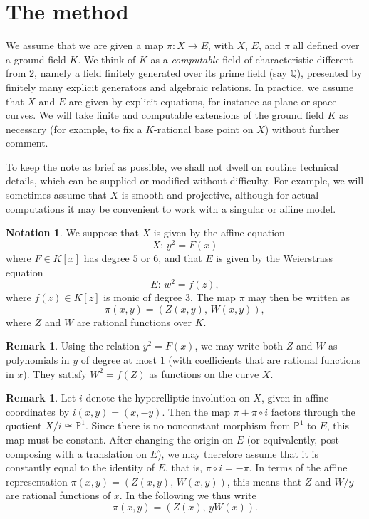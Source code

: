 \documentclass[a4paper,twoside,english]{amsart}
\theoremstyle{plain}
\theoremstyle{definition}
\newtheorem{remark}[theorem]{Remark}
\newtheorem{notation}[theorem]{Notation}
\begin{document}
\section{The method}

We assume that we are given a map $\pi:X\to E$, with $X$, $E$, and $\pi$ all defined over a ground field $K$. We think of $K$ as a \emph{computable} field of characteristic different from 2, namely a field finitely generated over its prime field (say $\mathbb Q$), presented by finitely many explicit generators and algebraic relations. In practice, we assume that $X$ and $E$ are given by explicit equations, for instance as plane or space curves. We will take finite and computable extensions of the ground field $K$ as necessary (for example, to fix a $K$-rational base point on $X$) without further comment.

To keep the note as brief as possible, we shall not dwell on routine technical details, which can be supplied or modified without difficulty. For example, we will sometimes assume that $X$ is smooth and projective, although for actual computations it may be convenient to work with a singular or affine model.

\begin{notation}
    We suppose that $X$ is given by the affine equation 
\[
X : \, y^2=F(x)
\]
where $F\in K[x]$ has degree $5$ or $6$, and that $E$ is given by the Weierstrass equation 
\[
E: \, w^2=f(z),
\]
where $f(z) \in K[z]$ is monic of degree $3$. 
The map $\pi$ may then be written as
\[
\pi(x,y)=(Z(x,y), \, W(x,y)),
\]
where $Z$ and $W$ are rational functions over $K$.
\end{notation}

\begin{remark}
    Using the relation $y^2=F(x)$, we may write both $Z$ and $W$ as polynomials in $y$ of degree at most $1$ (with coefficients that are rational functions in $x$). They satisfy $W^2=f(Z)$ as functions on the curve $X$.
\end{remark}

\begin{remark}\label{rmk: standard form map}
Let $i$ denote the hyperelliptic involution on $X$, given in affine coordinates by $i(x,y)=(x,-y)$. Then the map $\pi+\pi\circ i$ factors through the quotient $X/i\cong \mathbb P^1$.
Since there is no nonconstant morphism from $\mathbb P^1$ to $E$, this map must be constant. After changing the origin on $E$ (or equivalently, post-composing with a translation on $E$), we may therefore assume that it is constantly equal to the identity of $E$, that is, $\pi\circ i=-\pi$. In terms of the affine representation $\pi(x,y)=(Z(x,y),\, W(x,y))$, this means that $Z$ and $W/y$ are rational functions of $x$.
In the following we thus write
\[ \pi(x,y)=(Z(x),\, yW(x)). \]
\end{remark}
\end{document}
